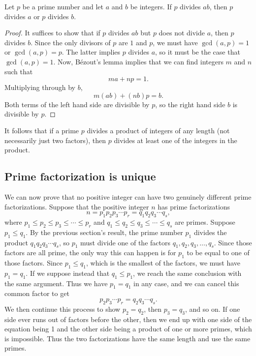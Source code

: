 \begin{proposition}\label{prop:prime}
Let $p$ be a prime number and let $a$ and $b$ be integers. If $p$ divides $ab$, then $p$ divides $a$ or $p$ divides $b$.
\end{proposition}
\begin{proof}
It suffices to show that if $p$ divides $ab$ but $p$ does not divide $a$, then $p$ divides $b$. Since the only divisors of $p$ are $1$ and $p$, we must have $\gcd(a,p) = 1$ or $\gcd(a,p) = p$. The latter implies $p$ divides $a$, so it must be the case that $\gcd(a,p) = 1$. Now, B\'{e}zout's lemma implies that we can find integers $m$ and $n$ such that
\begin{equation*}
ma + np = 1.
\end{equation*}
Multiplying through by $b$,
\begin{equation*}
m(ab) + (nb)p = b.
\end{equation*}
Both terms of the left hand side are divisible by $p$, so the right hand side $b$ is divisible by $p$.
\end{proof}

It follows that if a prime $p$ divides a product of integers of any length (not necessarily just two factors), then $p$ divides at least one of the integers in the product.


\subsection{Prime factorization is unique}

We can now prove that no positive integer can have two genuinely different prime factorizations. Suppose that the positive integer $n$ has prime factorizations
\begin{equation*}
n = p_1p_2p_3\cdots p_r = q_1q_2q_3\cdots q_s,
\end{equation*}
where $p_1\leq p_2\leq p_3\leq\cdots\leq p_r$ and $q_1\leq q_2\leq q_3\leq\cdots\leq q_s$ are primes. Suppose $p_1\leq q_1$. By the previous section's result, the prime number $p_1$ divides the product $q_1q_2q_3\cdots q_s$, so $p_1$ must divide one of the factors $q_1, q_2, q_3, \ldots, q_s$. Since those factors are all prime, the only way this can happen is for $p_1$ to be equal to one of those factors. Since $p_1\leq q_1$, which is the smallest of the factors, we must have $p_1 = q_1$. If we suppose instead that $q_1\leq p_1$, we reach the same conclusion with the same argument. Thus we have $p_1 = q_1$ in any case, and we can cancel this common factor to get
\begin{equation*}
p_2p_3\cdots p_r = q_2q_3\cdots q_s.
\end{equation*}
We then continue this process to show $p_2 = q_2$, then $p_3 = q_3$, and so on. If one side ever runs out of factors before the other, then we end up with one side of the equation being 1 and the other side being a product of one or more primes, which is impossible. Thus the two factorizations have the same length and use the same primes.